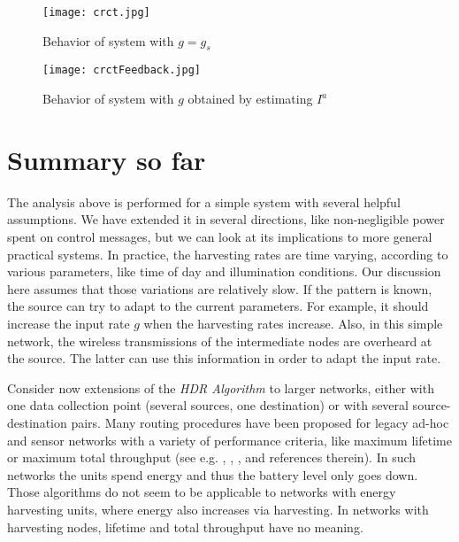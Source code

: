 \documentclass[12 pt]{article}
\newcommand{\debug}[1]{\mbox{\tt #1}}
\renewcommand{\debug}[1]{}              \newcommand{\cmd}[1]{}
\newcommand{\2}{\>\>}
\newcommand{\3}{\>\>\>}
\newcommand{\4}{\>\>\>\>}
\newcommand{\5}{\>\>\>\>\>}
\newcommand{\6}{\>\>\>\>\>\>}
\newcommand{\7}{\6\>}
\newcommand{\8}{\6\2}
\newcommand{\sname}{}
\newcommand{\dcite}[1]{\cite{#1}\debug{[#1]}\cmd{dcite}}
\newcommand{\dlabelx}[1]{\debug{\fbox{\tiny #1}}\label{#1}}
\newcommand{\msec}[2]{\renewcommand{\sname}{}\section[#1
	\debug{\fbox {#2}}]{#1 \cmd{msec} \dlabelx{#2}}\markboth{\today}{Sec. \thesection}}
\begin{document}
\begin{figure}[hbtp]
\begin{center}
\texttt{[image: crct.jpg]}
\caption{Behavior of system with $g = g_s$ \debug{\fbox{fig-crct}}\label{fig-crct}}
\end{center}
\end{figure}

\begin{figure}[hbtp]
\begin{center}
\texttt{[image: crctFeedback.jpg]}
\caption{Behavior of system with $g$ obtained by estimating $I^a$  \debug{\fbox{fig-crctFeedback}}\label{fig-crctFeedback}}
\end{center}
\end{figure}







\msec{Summary so far}{Implications}

The analysis above is performed for a simple system with several helpful assumptions.  We have extended it in several directions, like non-negligible power spent on control messages, but we can look at its implications to more general practical systems.  In practice, the harvesting rates are time varying, according to various parameters, like time of day and illumination conditions.  Our discussion here assumes that those variations are relatively slow. If the pattern is known, the source can try to adapt to the current parameters.  For example, it should increase the input rate $g$ when the harvesting rates increase.  Also, in this simple network, the wireless transmissions of the intermediate nodes are overheard at the source.  The latter can use this information in order to adapt the input rate.

Consider now extensions of the \emph{HDR Algorithm} to larger networks, either with one data collection point (several sources, one destination) or with several source-destination pairs.  Many routing procedures have been proposed for legacy ad-hoc and sensor networks with a variety of performance criteria, like maximum lifetime or maximum total throughput (see e.g. \dcite{AY}, \dcite{ASSC}, \dcite{KK}, \dcite{LS} and references therein).  In such networks the units spend energy and thus the battery level only goes down.  Those algorithms do not seem to be applicable to networks with energy harvesting units, where energy also increases via harvesting.  In networks with harvesting nodes, lifetime and total throughput have no meaning.
\end{document}
